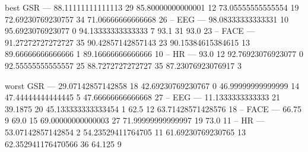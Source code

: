 
best
GSR ---
88.11111111111113 29
85.80000000000001 12
73.05555555555554 19
72.69230769230757 34
71.06666666666668 26
--
EEG ---
98.08333333333331 10
95.6923076923077 0
94.13333333333333 7
93.1 31
93.0 23
--
FACE ---
91.27272727272727 35
90.42857142857143 23
90.15384615384615 13
89.66666666666666 1
89.16666666666666 10
--
HR ---
93.0 12
92.76923076923077 0
92.55555555555557 25
88.7272727272727 35
87.23076923076917 3

worst
GSR ---
29.07142857142858 18
42.69230769230767 0
46.99999999999999 14
47.44444444444445 5
47.66666666666668 27
--
EEG ---
11.1333333333333 21
39.1875 20
45.133333333333454 1
62.5 12
63.71428571428576 18
--
FACE ---
66.75 9
69.0 15
69.00000000000003 27
71.99999999999997 19
73.0 11
--
HR ---
53.07142857142854 2
54.23529411764705 11
61.69230769230765 13
62.352941176470566 36
64.125 9